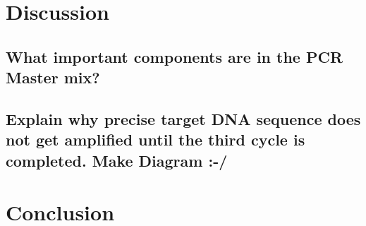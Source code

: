 \documentclass[paper=a4, fontsize=11pt]{scrartcl} %
\numberwithin{equation}{section} %
\numberwithin{figure}{section} %
\numberwithin{table}{section} %
\begin{document}
\section{Discussion}
\subsection{What important components are in the PCR Master mix?}
\subsection{Explain why precise target DNA sequence does not get amplified until the third cycle is completed. Make Diagram :-/}


\section{Conclusion}

\end{document}
